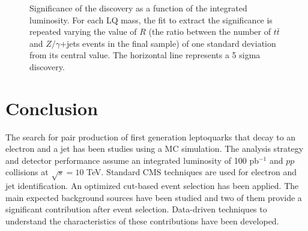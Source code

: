 \documentclass{cmspaper}
\begin{document}
\begin{linenumbers}
 \begin{figure}
   \begin{center}
     \caption{Significance of the discovery as a function of the integrated luminosity.
       For each LQ mass, the fit to extract the significance is repeated varying the value of $R$
       (the ratio between the number of $t\bar{t}$ and $Z/\gamma$+jets events in the final sample)
       of one standard deviation from its central value. 
       The horizontal line represents a 5 sigma discovery.}
     \label{fig:sign_vs_Lint_sysR}
   \end{center}
 \end{figure}


\section{Conclusion}

The search for pair production of first generation leptoquarks that decay to
an electron and a jet has been studies using a MC simulation.
The analysis strategy and detector performance assume an integrated luminosity of 100 pb$^{-1}$ and $pp$ collisions 
at $\sqrt{s}=10$ TeV.
Standard CMS techniques are used for electron and jet identification. 
An optimized cut-based event selection has been applied.
The main expected background sources have been studied and two of them provide 
a significant contribution after event selection. 
Data-driven techniques to understand the characteristics of these contributions have been developed.


\end{linenumbers}
\end{document}
